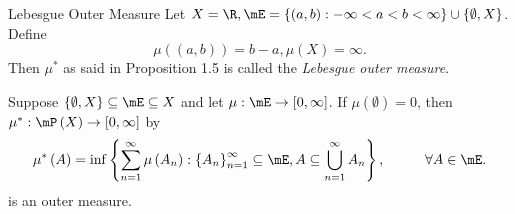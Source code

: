 \documentclass[pmath451]{subfiles}
\begin{document}
    \begin{example}{Lebesgue Outer Measure}
        Let $X = \R, \mE = \left\lbrace \left( a,b \right): -\infty<a<b<\infty \right\rbrace \cup \left\lbrace \emptyset, X \right\rbrace$. Define
        \begin{equation*}
            \mu\left( \left( a,b \right) \right) = b-a, \mu\left( X \right) = \infty.
        \end{equation*}
        Then $\mu^{*}$ as said in Proposition 1.5 is called the \emph{Lebesgue outer measure}.
    \end{example}

    \rruleline
    
    \begin{prop}{}
        Suppose $\left\lbrace \emptyset,X \right\rbrace\subseteq\mE\subseteq X$ and let $\mu:\mE\to\left[ 0,\infty \right]$. If $\mu\left( \emptyset \right) = 0$, then $\mu^{*}:\mP\left( X \right)\to\left[ 0,\infty \right]$ by
        \begin{equation*}
            \mu^{*}\left( A \right) = \inf\left\lbrace \sum^{\infty}_{n=1}\mu\left( A_n \right):\left\lbrace A_n \right\rbrace^{\infty}_{n=1}\subseteq\mE, A\subseteq\bigcup^{\infty}_{n=1}A_n \right\rbrace,\hspace{1cm}\forall A\in\mE.
        \end{equation*}
        is an outer measure.
    \end{prop}
\end{document}
